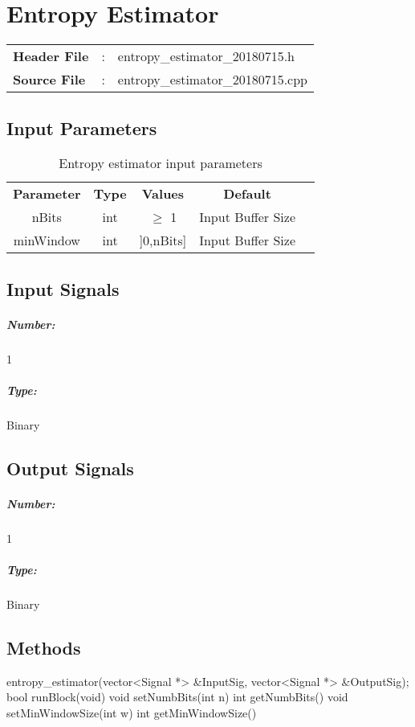 \clearpage

\section{Entropy Estimator}

\begin{tcolorbox}	
	\begin{tabular}{p{2.75cm} p{0.2cm} p{10.5cm}} 	
		\textbf{Header File}   &:& entropy_estimator_20180715.h \\
		\textbf{Source File}   &:& entropy_estimator_20180715.cpp \\
	\end{tabular}
\end{tcolorbox}


\subsection*{Input Parameters}

\begin{table}[h]
	\centering
	\begin{tabular}{|c|c|c|c|c|}
		\cline{1-4}
		\textbf{Parameter} & \textbf{Type} &\textbf{Values} &   \textbf{Default}& \\ \cline{1-4}
		nBits 	& int 	& $\geq$ 1 & Input Buffer Size \\ \cline{1-4}
		minWindow	 & int 	& ]0,nBits]  & Input Buffer Size \\ \cline{1-4} \cline{1-4}
	\end{tabular}
	\caption{Entropy estimator input parameters}
	\label{table:estimator_in_par}
\end{table}

\subsection*{Input Signals}
\subparagraph*{Number:} 1
\subparagraph*{Type:} Binary

\subsection*{Output Signals}
\subparagraph*{Number:} 1
\subparagraph*{Type:} Binary


\subsection*{Methods}

entropy_estimator(vector<Signal *> \&InputSig, vector<Signal *> \&OutputSig);
\bigbreak
bool runBlock(void)
\bigbreak
void setNumbBits(int n)
\bigbreak
int getNumbBits()
\bigbreak
void setMinWindowSize(int w)
\bigbreak
int getMinWindowSize()


